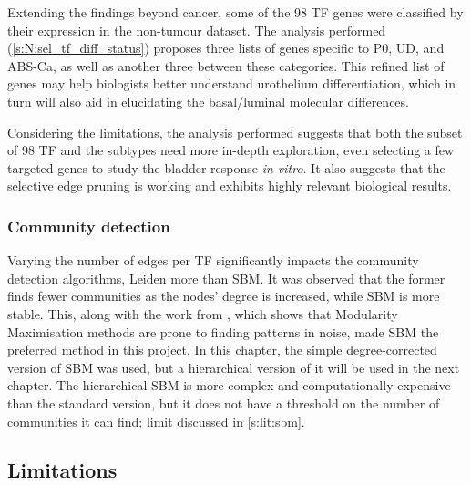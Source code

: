 Extending the findings beyond cancer, some of the 98 TF genes were classified by their expression in the non-tumour dataset. The analysis performed (\cref{s:N:sel_tf_diff_status}) proposes three lists of genes specific to P0, UD, and ABS-Ca, as well as another three between these categories. This refined list of genes may help biologists better understand urothelium differentiation, which in turn will also aid in elucidating the basal/luminal molecular differences.

Considering the limitations, the analysis performed suggests that both the subset of 98 TF and the subtypes need more in-depth exploration, even selecting a few targeted genes to study the bladder response \textit{in vitro}. It also suggests that the selective edge pruning is working and exhibits highly relevant biological results.

\subsubsection*{Community detection}

Varying the number of edges per TF significantly impacts the community detection algorithms, Leiden more than SBM. It was observed that the former finds fewer communities as the nodes' degree is increased, while SBM is more stable. This, along with the work from \citet{Peixoto2021-jx, Peixoto2023-rt}, which shows that Modularity Maximisation methods are prone to finding patterns in noise, made SBM the preferred method in this project. In this chapter, the simple degree-corrected version of SBM was used, but a hierarchical version of it will be used in the next chapter. The hierarchical SBM is more complex and computationally expensive than the standard version, but it does not have a threshold on the number of communities it can find; limit discussed in \cref{s:lit:sbm}.


\subsection* {Limitations}

